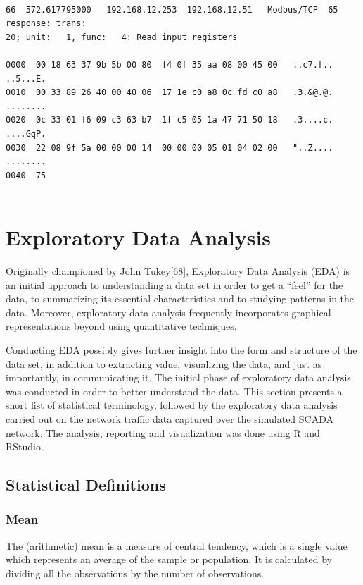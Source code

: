 \documentclass[11pt,]{article}
\begin{document}
\begin{verbatim}

66  572.617795000   192.168.12.253  192.168.12.51   Modbus/TCP  65  response: trans:
20; unit:   1, func:   4: Read input registers

0000  00 18 63 37 9b 5b 00 80  f4 0f 35 aa 08 00 45 00   ..c7.[.. ..5...E.
0010  00 33 89 26 40 00 40 06  17 1e c0 a8 0c fd c0 a8   .3.&@.@. ........
0020  0c 33 01 f6 09 c3 63 b7  1f c5 05 1a 47 71 50 18   .3....c. ....GqP.
0030  22 08 9f 5a 00 00 00 14  00 00 00 05 01 04 02 00   "..Z.... ........
0040  75
    
\end{verbatim}

\newpage

\section{Exploratory Data Analysis}\label{exploratory-data-analysis}

Originally championed by John Tukey{[}68{]}, Exploratory Data Analysis
(EDA) is an initial approach to understanding a data set in order to get
a ``feel'' for the data, to summarizing its essential characteristics
and to studying patterns in the data. Moreover, exploratory data
analysis frequently incorporates graphical representations beyond using
quantitative techniques.

Conducting EDA possibly gives further insight into the form and
structure of the data set, in addition to extracting value, visualizing
the data, and just as importantly, in communicating it. The initial
phase of exploratory data analysis was conducted in order to better
understand the data. This section presents a short list of statistical
terminology, followed by the exploratory data analysis carried out on
the network traffic data captured over the simulated SCADA network. The
analysis, reporting and visualization was done using R and RStudio.

\subsection{Statistical Definitions}\label{statistical-definitions}

\subsubsection{Mean}\label{mean}

The (arithmetic) mean is a measure of central tendency, which is a
single value which represents an average of the sample or population. It
is calculated by dividing all the observations by the number of
observations.
\end{document}
